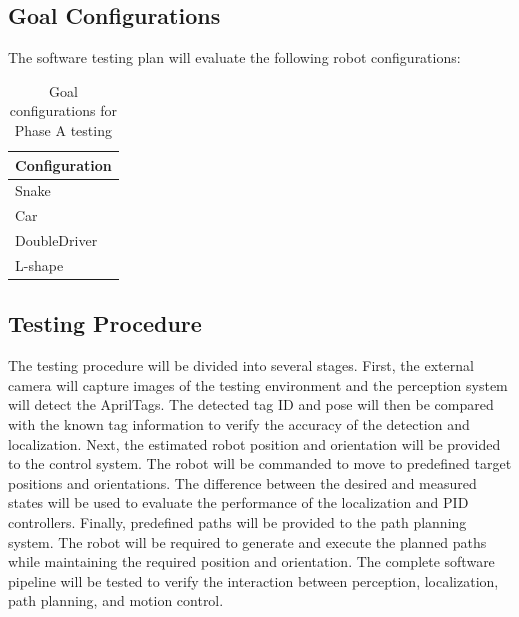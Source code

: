 \documentclass[12pt,a4paper]{article}
\begin{document}
	\subsection{Goal Configurations}
	The software testing plan will evaluate the following robot configurations:

	\begin{table}[htbp]
		\centering
		\caption{Goal configurations for Phase A testing}
		\label{tab:goal-configurations}
		\begin{tabular}{|l|}
		\hline
		\textbf{Configuration} \\ \hline
		Snake \\ \hline
		Car \\ \hline
		DoubleDriver \\ \hline
		L-shape \\ \hline
		\end{tabular}
	\end{table}

	\subsection{Testing Procedure}
	The testing procedure will be divided into several stages. First, the external camera will capture images of the testing environment and the perception system will detect the AprilTags. The detected tag ID and pose will then be compared with the known tag information to verify the accuracy of the detection and localization.
	Next, the estimated robot position and orientation will be provided to the control system. The robot will be commanded to move to predefined target positions and orientations. The difference between the desired and measured states will be used to evaluate the performance of the localization and PID controllers.
	Finally, predefined paths will be provided to the path planning system. The robot will be required to generate and execute the planned paths while maintaining the required position and orientation. The complete software pipeline will be tested to verify the interaction between perception, localization, path planning, and motion control.
\end{document}
